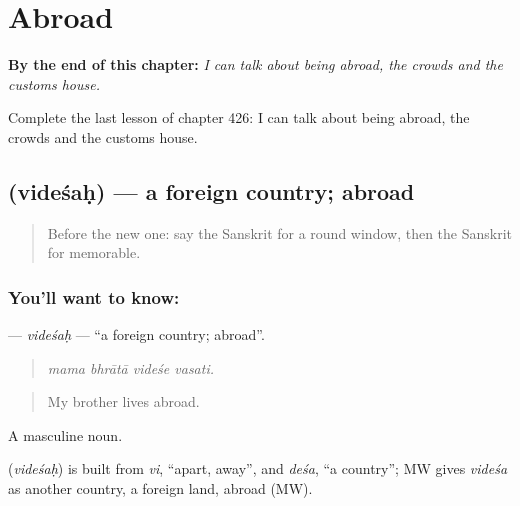 
\chapter{Abroad}
\label{ch:sa-abroad}

\begin{chapteropening}
\textbf{By the end of this chapter:} \emph{I can talk about being abroad, the crowds and the customs house.}

Complete the last lesson of chapter 426: I can talk about being abroad, the crowds and the customs house.
\end{chapteropening}

\section[\texorpdfstring{\sk{विदेशः} (videśaḥ)}{विदेशः (videśaḥ)}]{ (videśaḥ) — a foreign country; abroad}

\label{lesson:SA-C426-videsah}



\begin{quote}
Before the new one: say the Sanskrit for a round window, then the Sanskrit for memorable.
\end{quote}

\subsection*{You'll want to know: }
\textbf{} — \emph{videśaḥ} — \textquotedblleft{}a foreign country; abroad\textquotedblright{}.

\begin{quote}
   
\end{quote}

\begin{quote}
\emph{mama bhrātā videśe vasati.}
\end{quote}

\begin{quote}
My brother lives abroad.
\end{quote}

A masculine noun.

\begin{cousinweb}
\textbf{} (\emph{videśaḥ}) is built from \emph{vi}, \textquotedblleft{}apart, away\textquotedblright{}, and \emph{deśa}, \textquotedblleft{}a country\textquotedblright{}; MW gives \emph{videśa} as another country, a foreign land, abroad (MW).
\end{cousinweb}

